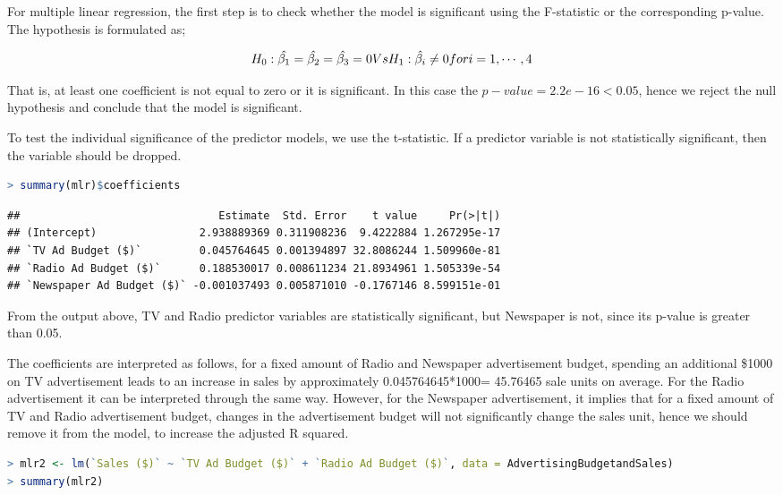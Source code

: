 \documentclass[
]{article}
\begin{document}
For multiple linear regression, the first step is to check whether the
model is significant using the F-statistic or the corresponding p-value.
The hypothesis is formulated as;

\[H_0:\hat{\beta_1}=\hat{\beta_2}=\hat{\beta_3}=0 \space\space Vs \space\space H_1:\hat{\beta_i}\neq0 \space for \space i=1,\cdots ,4\]

That is, at least one coefficient is not equal to zero or it is
significant. In this case the \(p-value =2.2e-16<0.05\), hence we reject
the null hypothesis and conclude that the model is significant.

To test the individual significance of the predictor models, we use the
t-statistic. If a predictor variable is not statistically significant,
then the variable should be dropped.

\begin{lstlisting}[language=R]
> summary(mlr)$coefficients
\end{lstlisting}

\begin{lstlisting}
##                               Estimate  Std. Error    t value     Pr(>|t|)
## (Intercept)                2.938889369 0.311908236  9.4222884 1.267295e-17
## `TV Ad Budget ($)`         0.045764645 0.001394897 32.8086244 1.509960e-81
## `Radio Ad Budget ($)`      0.188530017 0.008611234 21.8934961 1.505339e-54
## `Newspaper Ad Budget ($)` -0.001037493 0.005871010 -0.1767146 8.599151e-01
\end{lstlisting}

From the output above, TV and Radio predictor variables are
statistically significant, but Newspaper is not, since its p-value is
greater than 0.05.

The coefficients are interpreted as follows, for a fixed amount of Radio
and Newspaper advertisement budget, spending an additional \$1000 on TV
advertisement leads to an increase in sales by approximately
0.045764645*1000= 45.76465 sale units on average. For the Radio
advertisement it can be interpreted through the same way. However, for
the Newspaper advertisement, it implies that for a fixed amount of TV
and Radio advertisement budget, changes in the advertisement budget will
not significantly change the sales unit, hence we should remove it from
the model, to increase the adjusted R squared.

\begin{lstlisting}[language=R]
> mlr2 <- lm(`Sales ($)` ~ `TV Ad Budget ($)` + `Radio Ad Budget ($)`, data = AdvertisingBudgetandSales)
> summary(mlr2)
\end{lstlisting}
\end{document}
